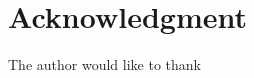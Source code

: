 \documentclass[10pt,journal,compsoc]{IEEEtran}
\begin{document}
\section*{Acknowledgment}
The author would like to thank 



%
%
%
\end{document}
